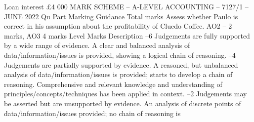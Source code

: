 \documentclass{article}
\begin{document}
Loan interest \newline
£4 000 \newline
 \newline
 \newline
 \newline
MARK SCHEME – A-LEVEL ACCOUNTING – 7127/1 – JUNE 2022  \newline
Qu \newline
Part \newline
Marking Guidance \newline
Total \newline
marks   \newline
Assess whether Paulo is correct in his assumption about the profitability of \newline
Cluedo Coffee.  \newline
 \newline
AO2 – 2 marks, AO3 4 marks \newline
 \newline
Level \newline
Marks \newline
Description  –6 \newline
Judgements are fully supported by a wide range of evidence.  A clear and balanced \newline
analysis of data/information/issues is provided, showing a logical chain of reasoning.  –4 \newline
Judgements are partially supported by evidence.  A reasoned, but unbalanced \newline
analysis of data/information/issues is provided; starts to develop a chain of \newline
reasoning.  Comprehensive and relevant knowledge and understanding of \newline
principles/concepts/techniques has been applied in context.  –2 \newline
Judgements may be asserted but are unsupported by evidence.  An analysis of \newline
discrete points of data/information/issues provided; no chain of reasoning is \newline
\end{document}
